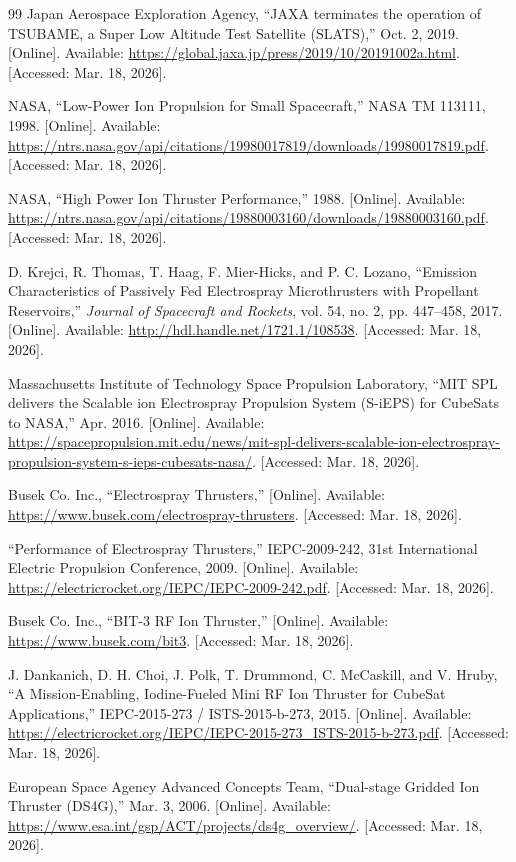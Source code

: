 \documentclass[11pt]{article}
\begin{document}
\begin{thebibliography}{99}
Japan Aerospace Exploration Agency, ``JAXA terminates the operation of TSUBAME, a Super Low Altitude Test Satellite (SLATS),'' Oct. 2, 2019. [Online]. Available: \url{https://global.jaxa.jp/press/2019/10/20191002a.html}. [Accessed: Mar. 18, 2026].

NASA, ``Low-Power Ion Propulsion for Small Spacecraft,'' NASA TM 113111, 1998. [Online]. Available: \url{https://ntrs.nasa.gov/api/citations/19980017819/downloads/19980017819.pdf}. [Accessed: Mar. 18, 2026].

NASA, ``High Power Ion Thruster Performance,'' 1988. [Online]. Available: \url{https://ntrs.nasa.gov/api/citations/19880003160/downloads/19880003160.pdf}. [Accessed: Mar. 18, 2026].

D. Krejci, R. Thomas, T. Haag, F. Mier-Hicks, and P. C. Lozano, ``Emission Characteristics of Passively Fed Electrospray Microthrusters with Propellant Reservoirs,'' \emph{Journal of Spacecraft and Rockets}, vol. 54, no. 2, pp. 447--458, 2017. [Online]. Available: \url{http://hdl.handle.net/1721.1/108538}. [Accessed: Mar. 18, 2026].

Massachusetts Institute of Technology Space Propulsion Laboratory, ``MIT SPL delivers the Scalable ion Electrospray Propulsion System (S-iEPS) for CubeSats to NASA,'' Apr. 2016. [Online]. Available: \url{https://spacepropulsion.mit.edu/news/mit-spl-delivers-scalable-ion-electrospray-propulsion-system-s-ieps-cubesats-nasa/}. [Accessed: Mar. 18, 2026].

Busek Co. Inc., ``Electrospray Thrusters,'' [Online]. Available: \url{https://www.busek.com/electrospray-thrusters}. [Accessed: Mar. 18, 2026].

``Performance of Electrospray Thrusters,'' IEPC-2009-242, 31st International Electric Propulsion Conference, 2009. [Online]. Available: \url{https://electricrocket.org/IEPC/IEPC-2009-242.pdf}. [Accessed: Mar. 18, 2026].

Busek Co. Inc., ``BIT-3 RF Ion Thruster,'' [Online]. Available: \url{https://www.busek.com/bit3}. [Accessed: Mar. 18, 2026].

J. Dankanich, D. H. Choi, J. Polk, T. Drummond, C. McCaskill, and V. Hruby, ``A Mission-Enabling, Iodine-Fueled Mini RF Ion Thruster for CubeSat Applications,'' IEPC-2015-273 / ISTS-2015-b-273, 2015. [Online]. Available: \url{https://electricrocket.org/IEPC/IEPC-2015-273_ISTS-2015-b-273.pdf}. [Accessed: Mar. 18, 2026].

European Space Agency Advanced Concepts Team, ``Dual-stage Gridded Ion Thruster (DS4G),'' Mar. 3, 2006. [Online]. Available: \url{https://www.esa.int/gsp/ACT/projects/ds4g_overview/}. [Accessed: Mar. 18, 2026].

\end{thebibliography}
\end{document}
